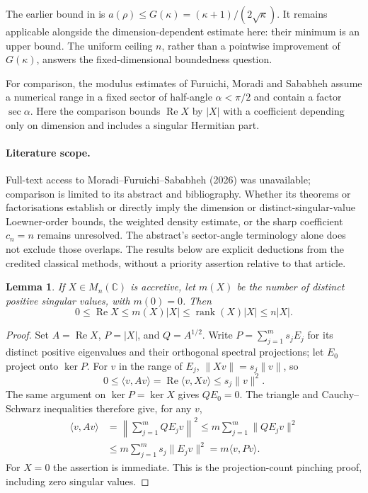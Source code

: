 \documentclass[11pt]{article}
\newcommand{\Ree}{\operatorname{Re}}
\newcommand{\rank}{\operatorname{rank}}
\newcommand{\C}{\mathbb C}
\newtheorem{lemma}[theorem]{Lemma}
\begin{document}
The earlier bound in \cite[Proposition 5.44(a)]{ANN} is
$a(\rho)\leq G(\kappa)=(\kappa+1)/(2\sqrt\kappa)$.
It remains applicable alongside the dimension-dependent estimate here:
their minimum is an upper bound. The uniform ceiling $n$, rather than
a pointwise improvement of $G(\kappa)$, answers the fixed-dimensional
boundedness question.

For comparison, the modulus estimates of Furuichi, Moradi and Sababheh
\cite[Section 2.5, Theorem 2.6]{FMS} assume a numerical range in a fixed
sector of half-angle $\alpha<\pi/2$ and contain a factor $\sec\alpha$.
Here the comparison bounds $\Ree X$ by $|X|$ with a coefficient depending
only on dimension and includes a singular Hermitian part.

\paragraph{Literature scope.}
Full-text access to Moradi--Furuichi--Sababheh (2026) \cite{MFS26}
was unavailable; comparison is limited to its abstract and bibliography.
Whether its theorems or factorisations establish or directly imply the
dimension or distinct-singular-value Loewner-order bounds, the weighted
density estimate, or the sharp coefficient $c_n=n$ remains unresolved.
The abstract's sector-angle terminology alone does not exclude those
overlaps. The results below are explicit deductions from the credited
classical methods, without a priority assertion relative to that article.

\begin{lemma}\label{lem:matrix}
If $X\in M_n(\C)$ is accretive, let $m(X)$ be the number of distinct
positive singular values, with $m(0)=0$. Then
\begin{equation}\label{eq:matrix}
0\leq\Ree X\leq m(X)|X|\leq\rank(X)|X|\leq n|X|.
\end{equation}
\end{lemma}
\begin{proof}
Set $A=\Ree X$, $P=|X|$, and $Q=A^{1/2}$.
Write $P=\sum_{j=1}^m s_jE_j$ for its distinct positive eigenvalues
and their orthogonal spectral projections; let $E_0$ project onto $\ker P$.
For $v$ in the range of $E_j$, $\|Xv\|=s_j\|v\|$, so
\begin{equation}\label{eq:diag}
0\leq\langle v,Av\rangle=\Ree\langle v,Xv\rangle
\leq s_j\|v\|^2.
\end{equation}
The same argument on $\ker P=\ker X$ gives $QE_0=0$.
The triangle and Cauchy--Schwarz inequalities therefore give, for any $v$,
\begin{align*}
\langle v,Av\rangle
&=\left\|\sum_{j=1}^m QE_jv\right\|^2
\leq m\sum_{j=1}^m\|QE_jv\|^2\\
&\leq m\sum_{j=1}^m s_j\|E_jv\|^2
=m\langle v,Pv\rangle.
\end{align*}
For $X=0$ the assertion is immediate. This is the projection-count
pinching proof, including zero singular values.
\end{proof}
\end{document}
